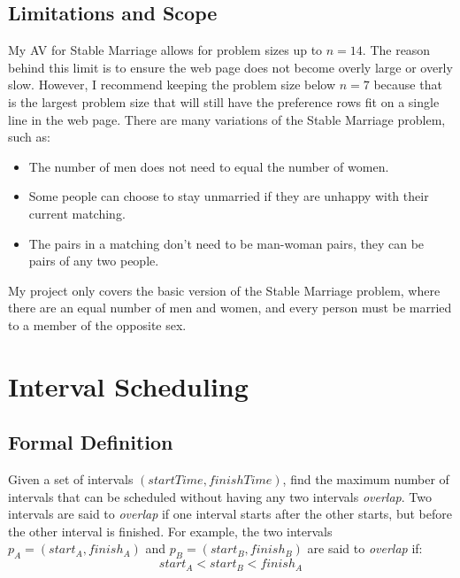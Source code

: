 \subsection{Limitations and Scope}
\hspace{-0.26in}
My AV for Stable Marriage allows for problem sizes up to $n = 14$.
The reason behind this limit is to ensure the web page 
does not become overly large or overly slow. 
However, I recommend keeping the problem size below $n = 7$ because that is 
the largest problem size that will still have the preference rows
fit on a single line in the web page. 
\newline\newline
There are many variations of the Stable Marriage problem, such as:
\begin{itemize}
	\item The number of men does not need to equal the number of women.
	\item Some people can choose to stay unmarried if they are unhappy 
		with their current matching.
	\item The pairs in a matching don't need to be man-woman pairs, they can be
		pairs of any two people.
\end{itemize} 
My project only covers the basic version of the Stable Marriage problem, where 
there are an equal number of men and women, and every person must be married to 
a member of the opposite sex. \cite{textbook}
\section{Interval Scheduling}
%
\subsection{Formal Definition}
\hspace{-0.26in}
Given a set of intervals $(start Time, finish Time)$, 
find the maximum number of intervals that can be scheduled 
without having any two intervals \textit{overlap}. 
\newline\newline
Two intervals are said to \textit{overlap} if one interval
starts after the other starts, but before the other interval is finished. 
For example, the two intervals 
$p_A = (start_A, finish_A)$ 
and
$ p_B=(start_B, finish_B)$
are said to \textit{overlap} if:
\begin{displaymath}
start_A < start_B < finish_A
\end{displaymath}
%
